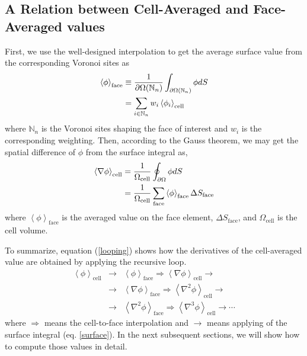 \documentclass[twocolumn]{aastex63}
\begin{document}
\subsection{A Relation between Cell-Averaged and Face-Averaged values}
First, we use the well-designed interpolation to get the average surface value from the corresponding Voronoi sites as
\begin{equation}
	\begin{aligned}
  \left< \phi\right>_\textrm{face}
  &\equiv {1\over \partial \Omega(\mathbb{N}_n)}
    \int_{\partial \Omega(\mathbb{N}_n)} \phi dS\\
  &= \sum_{i\in \mathbb{N}_n} w_i\left<\phi_i\right>_\textrm{cell}
\end{aligned}
\end{equation}
where $\mathbb{N}_n$ is the  Voronoi sites shaping the face of interest and $w_i$ is the corresponding weighting.
Then, according to the Gauss theorem, we may get the spatial difference of $\phi$ from the surface integral as,
\begin{equation} \label{surface}
	\begin{aligned}
  \left<\nabla\phi\right>_\textrm{cell}
  &= {1\over \Omega_\textrm{cell}} \oint_{\partial \Omega} \phi dS\\
  &= {1\over \Omega_\textrm{cell}}\sum_\textrm{face}
    \left<\phi\right>_\textrm{face} \Delta S_\textrm{face}
\end{aligned}
\end{equation}
where $\left<\phi\right>_\textrm{face}$ is the averaged value on the face element, $\Delta S_\textrm{face}$, and $\Omega_\textrm{cell}$ is the cell volume.

To summarize, equation (\ref{looping}) shows how the derivatives of the cell-averaged value are obtained by applying the recursive loop. \begin{eqnarray} \nonumber \label{looping}
	\left<\phi\right>_\textrm{cell} &\rightarrow &\left<\phi\right>_\textrm{face} \Rightarrow \left<\nabla\phi\right>_\textrm{cell} \rightarrow \\ \nonumber &\rightarrow& \left<\nabla\phi\right>_\textrm{face} \Rightarrow \left<\nabla^2\phi\right>_\textrm{cell} \rightarrow \\ 
	&\rightarrow& \left<\nabla^2\phi\right>_\textrm{face} \Rightarrow \left<\nabla^3\phi\right>_\textrm{cell} \rightarrow \cdots
\end{eqnarray}
where $\Rightarrow$ means the cell-to-face interpolation and $\rightarrow$ means applying of the surface integral (eq. \ref{surface}). In the next subsequent sections, we will show how to compute those values in detail.
\end{document}

